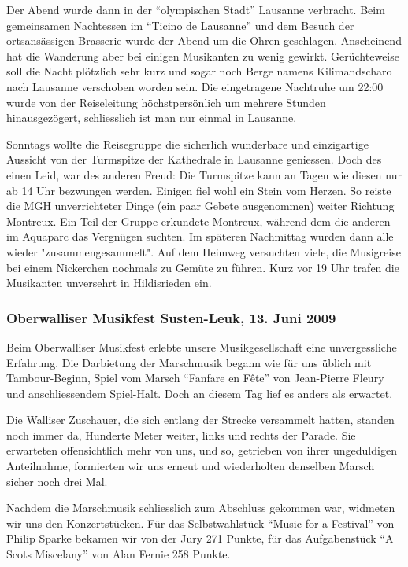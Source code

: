 \begin{history}
    Der Abend wurde dann in der \enquote{olympischen Stadt} Lausanne verbracht.
    Beim gemeinsamen Nachtessen im \enquote{Ticino de Lausanne} und dem Besuch
    der ortsansässigen Brasserie wurde der Abend um die Ohren geschlagen.
    Anscheinend hat die Wanderung aber bei einigen Musikanten zu wenig gewirkt.
    Gerüchteweise soll die Nacht plötzlich sehr kurz und sogar noch Berge namens
    Kilimandscharo nach Lausanne verschoben worden sein. Die eingetragene
    Nachtruhe um 22:00 wurde von der Reiseleitung höchstpersönlich um mehrere
    Stunden hinausgezögert, schliesslich ist man nur einmal in Lausanne.

    Sonntags wollte die Reisegruppe die sicherlich wunderbare und einzigartige
    Aussicht von der Turmspitze der Kathedrale in Lausanne geniessen. Doch des
    einen Leid, war des anderen Freud: Die Turmspitze kann an Tagen wie diesen
    nur ab 14 Uhr bezwungen werden. Einigen fiel wohl ein Stein vom Herzen. So
    reiste die MGH unverrichteter Dinge (ein paar Gebete ausgenommen) weiter
    Richtung Montreux. Ein Teil der Gruppe erkundete Montreux, während dem die
    anderen im Aquaparc das Vergnügen suchten. Im späteren Nachmittag wurden
    dann alle wieder "zusammengesammelt". Auf dem Heimweg versuchten viele, die
    Musigreise bei einem Nickerchen nochmals zu Gemüte zu führen. Kurz vor 19
    Uhr trafen die Musikanten unversehrt in Hildisrieden ein.


    \subsubsection*{Oberwalliser Musikfest Susten-Leuk, 13. Juni 2009}

    Beim Oberwalliser Musikfest erlebte unsere Musikgesellschaft eine
    unvergessliche Erfahrung. Die Darbietung der Marschmusik begann wie für uns
    üblich mit Tambour-Beginn, Spiel vom Marsch \enquote{Fanfare en Fête} von
    Jean-Pierre Fleury und anschliessendem Spiel-Halt. Doch an diesem Tag lief
    es anders als erwartet.

    Die Walliser Zuschauer, die sich entlang der Strecke versammelt hatten,
    standen noch immer da, Hunderte Meter weiter, links und rechts der Parade.
    Sie erwarteten offensichtlich mehr von uns, und so, getrieben von ihrer
    ungeduldigen Anteilnahme, formierten wir uns erneut und wiederholten
    denselben Marsch sicher noch drei Mal.

    Nachdem die Marschmusik schliesslich zum Abschluss gekommen war, widmeten
    wir uns den Konzertstücken. Für das Selbstwahlstück   \enquote{Music for a
        Festival} von Philip Sparke bekamen wir von der Jury 271 Punkte, für das
    Aufgabenstück \enquote{A Scots Miscelany} von Alan Fernie 258 Punkte.


\end{history}
